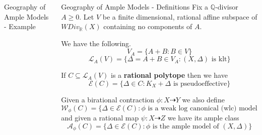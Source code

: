 \documentclass[final]{beamer}
\begin{document}
\begin{frame}[t, fragile]
\begin{columns}[t]
\begin{column}{0.36\paperwidth}
\begin{block}{Geography of Ample Models - Example}
\begin{figure}
				\end{figure}
				
				
				
			\end{block}
			
			
			
			
			
		\end{column}
		
		
		\begin{column}{0.44\paperwidth}
			
			\begin{block}{Geography of Ample Models - Definitions}
				Fix a $\mathbb{Q}$-divisor $A\geq 0$. Let $V$ be a finite dimensional, rational affine subspace of $WDiv_{\mathbb{R}}(X)$ containing no components of $A$.
				
				We have the following.
				\[V_{A}= \{A+B: B \in V\}\]
				\[\mathcal{L}_{A}(V)=\{\Delta=A+B \in V_{A}: (X,\Delta) \text{ is klt}\}\]
				
				If $C \subseteq \mathcal{L}_{A}(V)$ is a \textbf{rational polytope} then we have
				\[\mathcal{E}(C)=\{\Delta \in C: K_{X}+\Delta \text{ is pseudoeffective}\}\]
				
				Given a birational contraction $\phi:X \dashrightarrow Y$ we also define
				\[\mathcal{W}_{\phi}(C)=\{\Delta \in \mathcal{E}(C): \phi \text{ is a weak log canonical (wlc) model of } (X,\Delta)\}\]
				and given a rational map $\psi:X \dashrightarrow Z$ we have its ample class
				\[\mathcal{A}_{\phi}(C)=\{\Delta \in \mathcal{E}(C): \phi \text{ is the ample model of } (X,\Delta)\}\]
				

\end{block}
\end{column}
\end{columns}
\end{frame}
\end{document}
